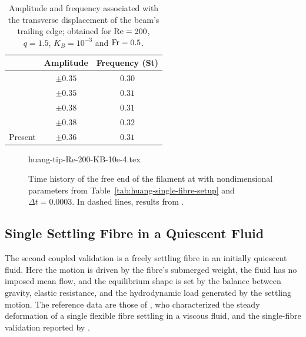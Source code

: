 \begin{table}[H]
    \centering
    \begin{tabular}{c|cc}
                                              & Amplitude    & Frequency (St) \\ \hline
        \textcite{huang_simulation_2007}      & \(\pm 0.35\) & \(0.30\)       \\
        \textcite{wang_strongly_2015}         & \(\pm 0.35\) & \(0.31\)       \\
        \textcite{lee_discrete-forcing_2015}  & \(\pm 0.38\) & \(0.31\)       \\
        \textcite{goza_strongly-coupled_2016} & \(\pm 0.38\) & \(0.32\)       \\
        Present                               & \(\pm 0.36\) & \(0.31\)       \\
    \end{tabular}
    \caption{Amplitude and frequency associated with the transverse displacement
        of the beam's trailing edge; obtained for \({\text {Re}} = 200\), \(q = 1.5\),
        \(K_B = 10^{-3}\) and \({\rm Fr} = 0.5\).}
    \label{tab:huang-re-200-kb-10e-3-results}
\end{table}

\begin{figure}[t]
    \centering
    {huang-tip-Re-200-KB-10e-4.tex}
    \caption{Time history of the free end of the filament at with nondimensional parameters from Table~\ref{tab:huang-single-fibre-setup} and \(\Delta t = 0.0003\). In dashed lines, results from \textcite{huang_simulation_2007}.}
    \label{fig:huang-tip-re-200-KB-10e-4}
\end{figure}

\subsection{Single Settling Fibre in a Quiescent Fluid}

The second coupled validation is a freely settling fibre in an initially
quiescent fluid. Here the motion is driven by the fibre's submerged weight, the
fluid has no imposed mean flow, and the equilibrium shape is set by the balance
between gravity, elastic resistance, and the hydrodynamic load generated by the
settling motion. The reference data are those of
\textcite{marchetti_deformation_2018}, who characterized the steady deformation
of a single flexible fibre settling in a viscous fluid, and the single-fibre
validation reported by \textcite{banaei_inertial_2020}.

